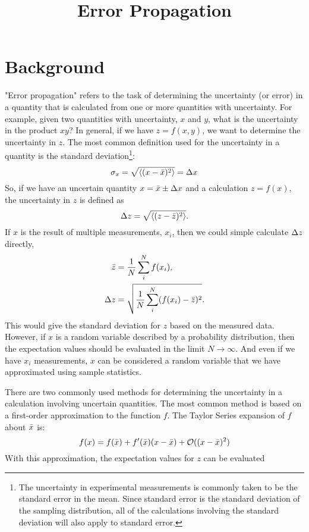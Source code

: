 \documentclass[letterpaper,10pt]{article}
\title{Error Propagation}
\begin{document}
\maketitle

\section{Background}

"Error propagation" refers to the task of determining the uncertainty (or error) in a quantity that is calculated from one or more quantities with uncertainty. For example, given two quantities
with uncertainty, $x$ and $y$, what is the uncertainty in the product $xy$? In general, if we have $z = f(x,y)$, we want to determine the uncertainty in $z$. The most common definition used
for the uncertainty in a quantity is the standard deviation\footnote{The uncertainty in experimental measurements is commonly taken to be the standard error in the mean. Since standard error is the standard deviation of the sampling distribution, all of the calculations involving the standard deviation will also apply to standard error.}:
$$
  \sigma_x = \sqrt{ \langle  (x - \bar{x})^2  \rangle } = \Delta{x}
$$
So, if we have an uncertain quantity $x = \bar{x} \pm \Delta{x}$ and a calculation $z = f(x)$, the uncertainty in $z$ is defined as
$$
  \Delta{z} = \sqrt{ \langle  (z - \bar{z})^2  \rangle }.
$$
If $x$ is the result of multiple measurements, ${x_i}$, then we could simple calculate $\Delta{z}$ directly,
\begin{align}
  \label{eq:calc-nom}
  \bar{z} &= \frac{1}{N} \sum_i^N  f(x_i),\\
  \Delta{z} &= \sqrt{ \frac{1}{N} \sum_i^N  (f(x_i) - \bar{z})^2 }.
\end{align}
This would give the standard deviation for $z$ based on the measured data. However, if $x$ is a random variable described by a probability distribution, then the expectation values should
be evaluated in the limit $N \rightarrow \infty$. And even if we have ${x_i}$ measurements, $x$ can be considered a random variable that we have approximated using sample statistics.

There are two commonly used methods for determining the uncertainty in a calculation involving uncertain quantities. The most common method is based on a first-order approximation to the function $f$.
The Taylor Series expansion of $f$ about $\bar{x}$ is:
$$
f(x) = f(\bar{x}) + f^{\prime}(\bar{x})(x - \bar{x}) + \mathcal{O}( (x-\bar{x})^2)
$$
With this approximation, the expectation values for $z$ can be evaluated
\end{document}
